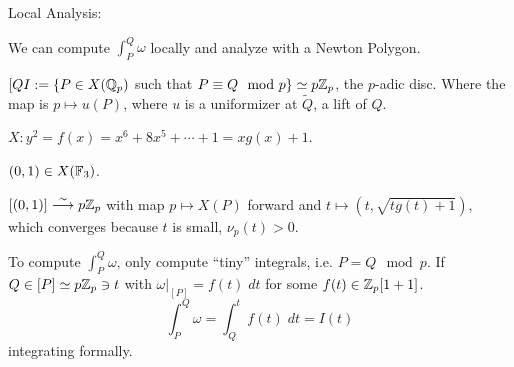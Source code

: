 Local Analysis:

We can compute $\int_P^Q \omega$ locally and analyze with a Newton Polygon.


$[QI:= \{P \in X(\mathbb{Q}_p)$ such that $P \equiv Q \mod p \} \simeq p\mathbb{Z}_p$, the $p$-adic disc. Where the map is $p \mapsto u(P)$, where $u$ is a uniformizer at $\tilde{Q}$, a lift of $Q$.


\begin{ex}[HP survey]
$X: y^2= f(x)= x^6+8x^5+\cdots+1= xg(x)+1$.

$(0,1) \in X(\mathbb{F}_3)$.

$[(0,1)] \stackrel{\sim}{\longrightarrow} p\mathbb{Z}_p$ with map $p \mapsto X(P)$ forward and $t \mapsto (t,\sqrt{tg(t)+1})$, which converges because $t$ is small, $\nu_p(t) > 0$. 
\end{ex}


To compute $\int_P^Q \omega$, only compute ``tiny'' integrals, i.e. $P=Q \mod p$. If $Q \in [P] \simeq p \mathbb{Z}_p \ni t$ with $\omega |_{[P]} = f(t) \;dt$ for some $f(t) \in \mathbb{Z}_p[1+1]$.
	\[
	\int_P^Q \omega= \int_Q^t f(t) \;dt = I(t)
	\]
integrating formally. 

























